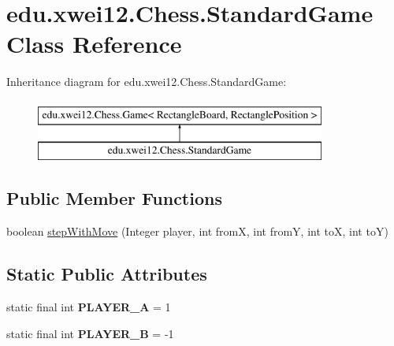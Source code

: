 \hypertarget{classedu_1_1xwei12_1_1_chess_1_1_standard_game}{}\section{edu.\+xwei12.\+Chess.\+Standard\+Game Class Reference}
\label{classedu_1_1xwei12_1_1_chess_1_1_standard_game}
Inheritance diagram for edu.\+xwei12.\+Chess.\+Standard\+Game\+:\begin{figure}[H]
\begin{center}
\leavevmode
\includegraphics[height=2.000000cm]{classedu_1_1xwei12_1_1_chess_1_1_standard_game}
\end{center}
\end{figure}
\subsection*{Public Member Functions}
\begin{DoxyCompactItemize}
\item 
boolean \hyperlink{classedu_1_1xwei12_1_1_chess_1_1_standard_game_aea0a64caa47fbf04b86bedf71494c8f0}{step\+With\+Move} (Integer player, int fromX, int fromY, int toX, int toY)
\end{DoxyCompactItemize}
\subsection*{Static Public Attributes}
\begin{DoxyCompactItemize}
\item 
static final int {\bfseries P\+L\+A\+Y\+E\+R\+\_\+A} = 1\hypertarget{classedu_1_1xwei12_1_1_chess_1_1_standard_game_a79b68e5516854df4c06fb8727a8b5dbb}{}\label{classedu_1_1xwei12_1_1_chess_1_1_standard_game_a79b68e5516854df4c06fb8727a8b5dbb}

\item 
static final int {\bfseries P\+L\+A\+Y\+E\+R\+\_\+B} = -\/1\hypertarget{classedu_1_1xwei12_1_1_chess_1_1_standard_game_a0fbfbb56669fbc6b30cd05ef8d3d37e0}{}\label{classedu_1_1xwei12_1_1_chess_1_1_standard_game_a0fbfbb56669fbc6b30cd05ef8d3d37e0}

\end{DoxyCompactItemize}
